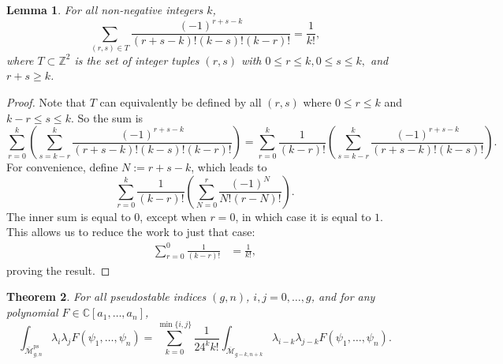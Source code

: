 \documentclass[leqno,12pt]{amsart}
\newtheorem{theorem}{Theorem}[section]
\newtheorem{lemma}[theorem]{Lemma}
\theoremstyle{remark}
\numberwithin{equation}{section}
\DeclareMathOperator{\ps}{ps}
\begin{document}
\begin{lemma}\label{lemma}For all non-negative integers $k$,
$$\sum_{(r, s) \in T}\frac{(-1)^{r+s-k}}{(r+s-k)!(k-s)!(k-r)!} = \frac{1}{k!},
$$
where $T\subset \mathbb{Z}^2$ is the set of integer tuples $(r, s)$ with $0 \leq r \leq k, 0 \leq s \leq k,$ and $r + s \geq k$.
\end{lemma}
\begin{proof}
    Note that $T$ can equivalently be defined by all $(r, s)$ where $0 \leq r \leq k$ and $k-r \leq s \leq k$. So the sum is 
    $$
    \sum_{r=0}^k\left(\sum_{s=k-r}^k\frac{(-1)^{r+s-k}}{(r+s-k)!(k-s)!(k-r)!}\right) = \sum_{r=0}^k\frac{1}{(k-r)!}\left(\sum_{s=k-r}^k\frac{(-1)^{r+s-k}}{(r+s-k)!(k-s)!}\right).
    $$
    For convenience, define $N := r+s-k$, which leads to
    $$
    \sum_{r=0}^k\frac{1}{(k-r)!}\left(\sum_{N = 0}^r\frac{(-1)^{N}}{N!(r-N)!}\right).
    $$
    The inner sum is equal to $0$, except when $r = 0$, in which case it is equal to $1$. This allows us to reduce the work to just that case:
    \begin{align*}
        \sum_{r=0}^0\frac{1}{(k-r)!}
        &= \frac{1}{k!},
    \end{align*}
    proving the result.
\end{proof}

\begin{theorem}\label{QHI}
    For all pseudostable indices $(g,n)$,  $i, j = 0, \dots, g$, and for any polynomial $F \in \mathbb{C}[a_1, \dots, a_n]$, $$\int_{\overline{\mathcal{M}}^{\ps}_{g, n}} \lambda_{i}\lambda_{j}F(\psi_1, \dots, \psi_n) = \sum_{k=0}^{\min\{i, j\}} \frac{1}{24^kk!}\int_{\overline{\mathcal{M}}_{g-k, n+k}} \lambda_{i-k}\lambda_{j-k}F(\psi_1, \dots, \psi_n).$$
\end{theorem}
\end{document}
